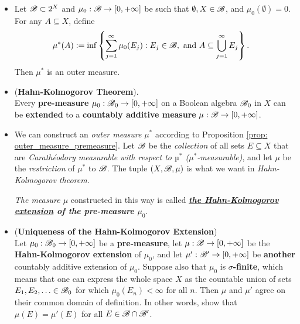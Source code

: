 \documentclass[11pt]{article}
\begin{document}
\begin{itemize}
\item \begin{proposition} \label{prop: outer_measure_premeasure}
Let ${\mathscr B} \subset 2^X$ and $\mu_0: {\mathscr B} \rightarrow [0, +\infty]$ be such that $\emptyset, X \in {\mathscr B}$, and $\mu_0(\emptyset) = 0$. For any $A \subseteq X$, define 
\begin{align*}
\mu^{*}(A) &:= \inf\left\{\sum_{j=1}^{\infty}\mu_0(E_j): E_j \in {\mathscr B}, \text{ and } A \subseteq \bigcup_{j=1}^{\infty}E_j\right\}. 
\end{align*} Then $\mu^{*}$ is an outer measure. 
\end{proposition}

\item \begin{theorem} (\textbf{Hahn-Kolmogorov Theorem}).\\
Every \textbf{pre-measure} $\mu_0 : {\mathscr B}_0 \rightarrow [0, +\infty]$  on a Boolean algebra ${\mathscr B}_{0}$ in $X$ can be \textbf{extended} to a \textbf{countably additive measure} $\mu : {\mathscr B} \rightarrow [0, +\infty]$.
\end{theorem}

\item \begin{remark}
We can construct an \emph{outer measure} $\mu^{*}$ according to Proposition \ref{prop: outer_measure_premeasure}. Let ${\mathscr B}$ be the \emph{collection} of all sets $E \subseteq X$ that are \textit{Carath\'eodory measurable with respect to $µ^{*}$ ($\mu^{*}$-measurable)}, and let $\mu$ be the \emph{restriction} of $\mu^{*}$  to ${\mathscr B}$. The tuple $(X, {\mathscr B}, \mu)$ is what we want in \emph{Hahn-Kolmogorov theorem}. 

\emph{The measure $\mu$} constructed in this way is called \emph{\textbf{ \underline{the Hahn-Kolmogorov extension} of the pre-measure $\mu_0$}}. 
\end{remark}

\item \begin{proposition} (\textbf{Uniqueness of the Hahn-Kolmogorov Extension})\\
Let $\mu_0 : {\mathscr B}_0 \rightarrow [0, +\infty]$ be a \textbf{pre-measure}, let $\mu : {\mathscr B} \rightarrow [0, +\infty]$ be the \textbf{Hahn-Kolmogorov extension} of $\mu_0$, and let $\mu' : {\mathscr B}' \rightarrow  [0, +\infty]$ be \textbf{another} countably additive extension of $\mu_0$. Suppose also that $\mu_0$ is \textbf{$\sigma$-finite}, which means that one can express the whole space $X$ as the countable union of sets $E_1, E_2, \ldots \in {\mathscr B}_{0}$ for which $\mu_0(E_n) < \infty$ for all $n$. Then $\mu$ and $\mu'$ agree on their common domain of definition. In other words, show that  $\mu(E) = \mu'(E)$ for all $E \in {\mathscr B} \cap {\mathscr B}'$.
\end{proposition}
\end{itemize}
\newpage
\end{document}
